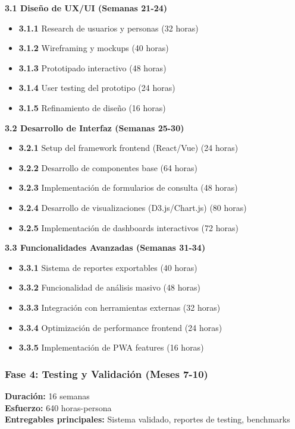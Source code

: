 \textbf{3.1 Diseño de UX/UI (Semanas 21-24)}
\begin{itemize}
    \item \textbf{3.1.1} Research de usuarios y personas (32 horas)
    \item \textbf{3.1.2} Wireframing y mockups (40 horas)
    \item \textbf{3.1.3} Prototipado interactivo (48 horas)
    \item \textbf{3.1.4} User testing del prototipo (24 horas)
    \item \textbf{3.1.5} Refinamiento de diseño (16 horas)
\end{itemize}

\textbf{3.2 Desarrollo de Interfaz (Semanas 25-30)}
\begin{itemize}
    \item \textbf{3.2.1} Setup del framework frontend (React/Vue) (24 horas)
    \item \textbf{3.2.2} Desarrollo de componentes base (64 horas)
    \item \textbf{3.2.3} Implementación de formularios de consulta (48 horas)
    \item \textbf{3.2.4} Desarrollo de visualizaciones (D3.js/Chart.js) (80 horas)
    \item \textbf{3.2.5} Implementación de dashboards interactivos (72 horas)
\end{itemize}

\textbf{3.3 Funcionalidades Avanzadas (Semanas 31-34)}
\begin{itemize}
    \item \textbf{3.3.1} Sistema de reportes exportables (40 horas)
    \item \textbf{3.3.2} Funcionalidad de análisis masivo (48 horas)
    \item \textbf{3.3.3} Integración con herramientas externas (32 horas)
    \item \textbf{3.3.4} Optimización de performance frontend (24 horas)
    \item \textbf{3.3.5} Implementación de PWA features (16 horas)
\end{itemize}

\subsubsection{Fase 4: Testing y Validación (Meses 7-10)}
\textbf{Duración:} 16 semanas \\
\textbf{Esfuerzo:} 640 horas-persona \\
\textbf{Entregables principales:} Sistema validado, reportes de testing, benchmarks

